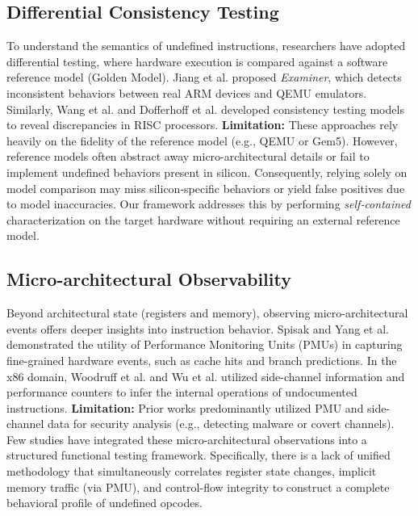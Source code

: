 \documentclass[pdflatex,sn-mathphys]{sn-jnl}%
\theoremstyle{thmstyleone}%
\theoremstyle{thmstyletwo}%
\theoremstyle{thmstylethree}%
\begin{document}
\subsection{Differential Consistency Testing}
To understand the semantics of undefined instructions, researchers have adopted differential testing, where hardware execution is compared against a software reference model (Golden Model). Jiang et al. \cite{jiang2021automatically} proposed \textit{Examiner}, which detects inconsistent behaviors between real ARM devices and QEMU emulators. Similarly, Wang et al. \cite{wang2021consistency} and Dofferhoff et al. \cite{dofferhoff2020iscanu} developed consistency testing models to reveal discrepancies in RISC processors.
\textbf{Limitation:} These approaches rely heavily on the fidelity of the reference model (e.g., QEMU or Gem5). However, reference models often abstract away micro-architectural details or fail to implement undefined behaviors present in silicon. Consequently, relying solely on model comparison may miss silicon-specific behaviors or yield false positives due to model inaccuracies. Our framework addresses this by performing \textit{self-contained} characterization on the target hardware without requiring an external reference model.

\subsection{Micro-architectural Observability}
Beyond architectural state (registers and memory), observing micro-architectural events offers deeper insights into instruction behavior. Spisak \cite{spisak2016hardware} and Yang et al. \cite{yang2023exploration} demonstrated the utility of Performance Monitoring Units (PMUs) in capturing fine-grained hardware events, such as cache hits and branch predictions. In the x86 domain, Woodruff et al. \cite{woodruff2021differential} and Wu et al. \cite{wu2021high} utilized side-channel information and performance counters to infer the internal operations of undocumented instructions.
\textbf{Limitation:} Prior works predominantly utilized PMU and side-channel data for security analysis (e.g., detecting malware or covert channels). Few studies have integrated these micro-architectural observations into a structured functional testing framework. Specifically, there is a lack of unified methodology that simultaneously correlates register state changes, implicit memory traffic (via PMU), and control-flow integrity to construct a complete behavioral profile of undefined opcodes.
\end{document}
